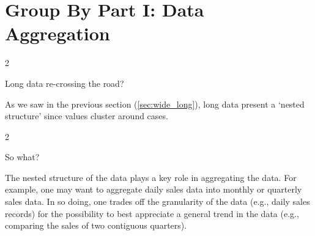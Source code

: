 \documentclass[a4paper,11pt]{book}
\newcommand{\question}[1]{%
    \begin{tcolorbox}[colback=comp_c!10,colframe=comp_c,sidebyside align=top,width=\linewidth,before skip=1ex]
        #1
    \end{tcolorbox}
    \switchcolumn%
}
\newcommand{\note}[1]{%
    \begin{tcolorbox}[colback=white!0,colframe=white!10,width=\linewidth,before skip=1ex]
        #1
    \end{tcolorbox}
}
\begin{document}
\section{Group By Part I: Data Aggregation}
\label{sec:groupby_aggr}

\begin{paracol}{2}
	\question{\raggedright Long data re-crossing the road?}
	\note{As we saw in the previous section (\ref{sec:wide_long}), long data present a `nested structure' since values cluster around cases.}
\end{paracol}

\begin{paracol}{2}
	\question{\raggedright So what?}
	\note{The nested structure of the data plays a key role in aggregating the data. For example, one may want to aggregate daily sales data into monthly or quarterly sales data. In so doing, one trades off the granularity of the data (e.g., daily sales records) for the possibility to best appreciate a general trend in the data (e.g., comparing the sales of two contiguous quarters).} 
\end{paracol}
\end{document}
